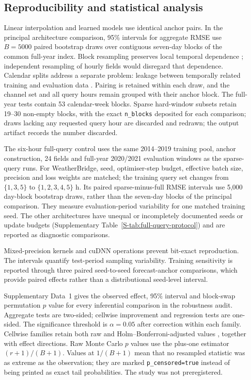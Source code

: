 \documentclass[referee,lineno,pdflatex,sn-nature]{sn-jnl}
\begin{document}
\subsection{Reproducibility and statistical analysis}
\label{sec:reproducibility}

Linear interpolation and learned models use identical anchor pairs. In the
principal architecture comparison, 95\% intervals for aggregate RMSE use
$B{=}5000$ paired bootstrap draws over contiguous seven-day blocks of
the common full-year index. Block resampling preserves local temporal
dependence \cite{kunsch1989jackknife}; independent resampling of hourly
fields would disregard that dependence. Calendar splits address a separate
problem: leakage between temporally related training and evaluation data
\cite{roberts2017crossvalidation}. Pairing is retained within each draw, and
the channel set and all query hours remain grouped with their
anchor block. The full-year tests contain 53 calendar-week blocks. Sparse
hard-window subsets retain 19--30 non-empty blocks, with the exact
\texttt{n\_blocks} deposited for each comparison; draws lacking any requested
query hour are discarded and redrawn; the output artifact records the number
discarded.

The six-hour full-query control uses the same 2014--2019 training pool,
anchor construction, 24 fields and full-year 2020/2021 evaluation windows
as the sparse-query runs. For WeatherBridge, seed, optimiser-step budget,
effective batch size, precision and loss weights are matched; the training
query set changes from $\{1,3,5\}$ to $\{1,2,3,4,5\}$ h. Its paired
sparse-minus-full RMSE intervals use 5,000 day-block bootstrap draws,
rather than the seven-day blocks of the principal comparison. They measure
evaluation-period variability for one matched training seed. The other
architectures have unequal or incompletely documented seeds or update
budgets (Supplementary Table~\ref{S-tab:full-query-protocol}) and are
reported as diagnostic comparisons.

Mixed-precision kernels and cuDNN operations prevent bit-exact
reproduction. The intervals quantify test-period sampling variability.
Training sensitivity is reported through three paired seed-to-seed
forecast-anchor comparisons, which provide paired effects rather than a
distributional seed-level interval.

Supplementary Data~1 gives the observed effect, 95\% interval and block-swap
permutation $p$ value for every inferential comparison in the robustness
audit. Aggregate tests are two-sided; cellwise improvement and regression
tests are one-sided. The significance threshold is $\alpha=0.05$ after
correction within each family. Cellwise families retain both raw and
Holm--Bonferroni-adjusted values \cite{holm1979simple}, together with effect
directions. Raw Monte Carlo $p$ values use the plus-one
estimator $(r+1)/(B+1)$. Values at $1/(B+1)$ mean that no resampled statistic
was as extreme as the observation; they are marked
\texttt{p\_censored=true} instead of being printed as exact tail probabilities. The study
was not preregistered.
\end{document}
